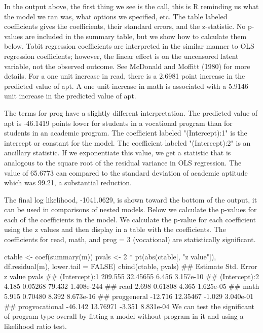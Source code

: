 \documentclass{beamer}
\begin{document}
\begin{frame}[fragile]
In the output above, the first thing we see is the call, this is R reminding us what the model we ran was, what options we specified, etc.
The table labeled coefficients gives the coefficients, their standard errors, and the z-statistic. No p-values are included in the summary table, but we show how to calculate them below. Tobit regression coefficients are interpreted in the similar manner to OLS regression coefficients; however, the linear effect is on the uncensored latent variable, not the observed outcome. See McDonald and Moffitt (1980) for more details.
For a one unit increase in read, there is a 2.6981 point increase in the predicted value of apt.
A one unit increase in math is associated with a 5.9146 unit increase in the predicted value of apt.
\end{frame}
\begin{frame}[fragile]
The terms for prog have a slightly different interpretation. The predicted value of apt is -46.1419 points lower for students in a vocational program than for students in an academic program.
The coefficient labeled "(Intercept):1" is the intercept or constant for the model.
The coefficient labeled "(Intercept):2" is an ancillary statistic. If we exponentiate this value, we get a statistic that is analogous to the square root of the residual variance in OLS regression. The value of 65.6773 can compared to the standard deviation of academic aptitude which was 99.21, a substantial reduction.
\end{frame}
\begin{frame}[fragile]
The final log likelihood, -1041.0629, is shown toward the bottom of the output, it can be used in comparisons of nested models.
Below we calculate the p-values for each of the coefficients in the model. We calculate the p-value for each coefficient using the z values and then display in a table with the coefficients. The coefficients for read, math, and prog = 3 (vocational) are statistically significant.
\end{frame}
\begin{frame}[fragile]
ctable <- coef(summary(m))
pvals <- 2 * pt(abs(ctable[, "z value"]), df.residual(m), lower.tail = FALSE)
cbind(ctable, pvals)
##                Estimate Std. Error z value      pvals
## (Intercept):1   209.555   32.45655   6.456  3.157e-10
## (Intercept):2     4.185    0.05268  79.432 1.408e-244
## read              2.698    0.61808   4.365  1.625e-05
## math              5.915    0.70480   8.392  8.673e-16
## proggeneral     -12.716   12.35467  -1.029  3.040e-01
## progvocational  -46.142   13.76971  -3.351  8.831e-04
We can test the significant of program type overall by fitting a model without program in it and using a likelihood ratio test.
\end{frame}
\end{document}
